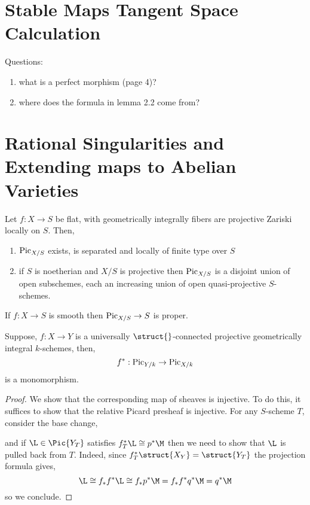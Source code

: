 \documentclass[12pt]{article}
\begin{document}
\section{Stable Maps Tangent Space Calculation}

Questions:
\begin{enumerate}
\item what is a perfect morphism (page 4)?

\item where does the formula in lemma 2.2 come from?
\end{enumerate}

\section{Rational Singularities and Extending maps to Abelian Varieties}

\begin{theorem}
Let $f : X \to S$ be flat, with geometrically integrally fibers are projective Zariski locally on $S$. Then,
\begin{enumerate}
\item $\mathrm{Pic}_{X/S}$ exists, is separated and locally of finite type over $S$

\item if $S$ is noetherian and $X / S$ is projective then $\mathrm{Pic}_{X/S}$ is a disjoint union of open subschemes, each an increasing union of open quasi-projective $S$-schemes.
\end{enumerate}
\end{theorem}

\begin{theorem}
If $f : X \to S$ is smooth then $\mathrm{Pic}_{X/S} \to S$ is proper.
\end{theorem}

\begin{theorem}
Suppose, $f : X \to Y$ is a universally $\struct{}$-connected projective geometrically integral $k$-schemes, then,
\[ f^* : \mathrm{Pic}_{Y/k} \to \mathrm{Pic}_{X/k} \]
is a monomorphism. 
\end{theorem}

\begin{proof}
We show that the corresponding map of sheaves is injective. To do this, it suffices to show that the relative Picard presheaf is injective. For any $S$-scheme $T$, consider the base change,
\begin{center}
\end{center}
and if $\L \in \Pic{Y_T}$ satisfies $f_T^* \L \cong p^* \M$ then we need to show that $\L$ is pulled back from $T$.
Indeed, since $f_T^* \struct{X_Y} = \struct{Y_T}$ the projection formula gives,
\[ \L \cong f_* f^* \L \cong f_* p^* \M = f_* f^* q^* \M = q^* \M \]
so we conclude.
\end{proof}
\end{document}
